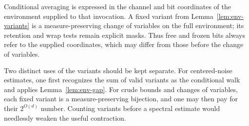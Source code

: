 \begin{remark}
\label{rem:env-effective}
Conditional averaging is expressed in the channel and bit coordinates
of the environment supplied to that invocation. A fixed variant from
Lemma~\ref{lem:env-variants} is a measure-preserving change of variables
on the full environment; its retention and wrap tests remain explicit masks.
Thus free and frozen bits always refer to the supplied coordinates,
which may differ from those before the change of variables.
\end{remark}

\begin{remark}\label{rem:env-averaging}
Two distinct uses of the variants should be kept separate.
For centered-noise estimates, one first recognizes the sum of valid
variants as the conditional walk and applies
Lemma~\ref{lem:env-gap}. For crude bounds and changes of variables,
each fixed variant is a measure-preserving bijection, and one may
then pay for their $2^{O(d)}$ number. Counting variants before a
spectral estimate would needlessly weaken the useful contraction.
\end{remark}
